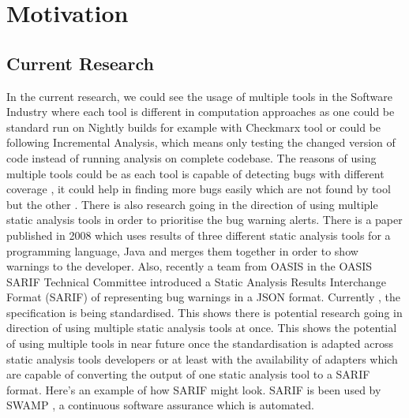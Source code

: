 \chapter{Motivation}
\label{ch:motivation}

\section{Current Research}

In the current research, we could see the usage of multiple tools in the Software Industry where each tool is different in computation approaches as one could be standard run on Nightly builds for example with Checkmarx \cite{checkmarx} tool or could be following Incremental Analysis, which means only testing the changed version of code instead of running analysis on complete codebase. The reasons of using multiple tools could be as each tool is capable of detecting bugs with different coverage \cite{bessey2010few} \cite{delaitre2015evaluating}, it could help in finding more bugs easily which are not found by tool but the other \cite{plakosh2014improving}. There is also research \cite{flynn2018prioritizing} going in the direction of using multiple static analysis tools in order to prioritise the bug warning alerts. There is a paper \cite{meng2008approach} published in 2008 which uses results of three different static analysis tools for a programming language, Java and merges them together in order to show warnings to the developer. Also, recently a team from OASIS \cite{oasis} in the OASIS SARIF Technical Committee \cite{oasis-tc} introduced a Static Analysis Results Interchange Format (SARIF) of representing bug warnings in a JSON format. Currently \cite{sarif-git}, the specification is being standardised. This shows there is potential research going in direction of using multiple static analysis tools at once. This shows the potential of using multiple tools in near future once the standardisation is adapted across static analysis tools developers or at least with the availability of adapters which are capable of converting the output of one static analysis tool to a SARIF format. Here's an example \cite{sarif-example} of how SARIF might look. SARIF is been used by SWAMP \cite{swamp-scarf-sarif}, a continuous software assurance which is automated. \\

